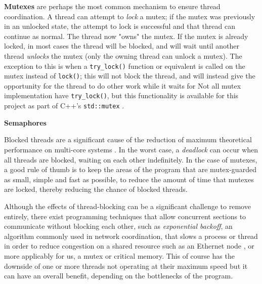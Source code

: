 \documentclass[11pt, a4paper, twocolumn]{article}
\begin{document}
\textbf{Mutexes} are perhaps the most common mechanism to ensure thread coordination. A thread can attempt to \emph{lock} a mutex; if the mutex was previously in an unlocked state, the attempt to lock is successful and that thread can continue as normal. The thread now "owns" the mutex. If the mutex is already locked, in most cases the thread will be blocked, and will wait until another thread \emph{unlocks} the mutex (only the owning thread can unlock a mutex). The exception to this is when a \verb|try_lock()| function or equivalent is called on the mutex instead of \verb|lock()|; this will not block the thread, and will instead give the opportunity for the thread to do other work while it waits for  Not all mutex implementation have \verb|try_lock()|, but this functionality is available for this project as part of C++'s \verb|std::mutex| \citep{CppMutex}. %


\textbf{Semaphores}

Blocked threads are a significant cause of the reduction of maximum theoretical performance on multi-core systems \citep{Alemany1992}. In the worst case, a \emph{deadlock} can occur when all threads are blocked, waiting on each other indefinitely. In the case of mutexes, a good rule of thumb is to keep the areas of the program that are mutex-guarded as small, simple and fast as possible, to reduce the amount of time that mutexes are locked, thereby reducing the chance of blocked threads.

Although the effects of thread-blocking can be a significant challenge to remove entirely, there exist programming techniques that allow concurrent sections to communicate without blocking each other, such as \emph{exponential backoff}, an algorithm commonly used in network coordination, that slows a process or thread in order to reduce congestion on a shared resource such as an Ethernet node \citep{Goodman2019}, or more applicably for us, a mutex or critical memory. This of course has the downside of one or more threads not operating at their maximum speed but it can have an overall benefit, depending on the bottlenecks of the program.
\end{document}
